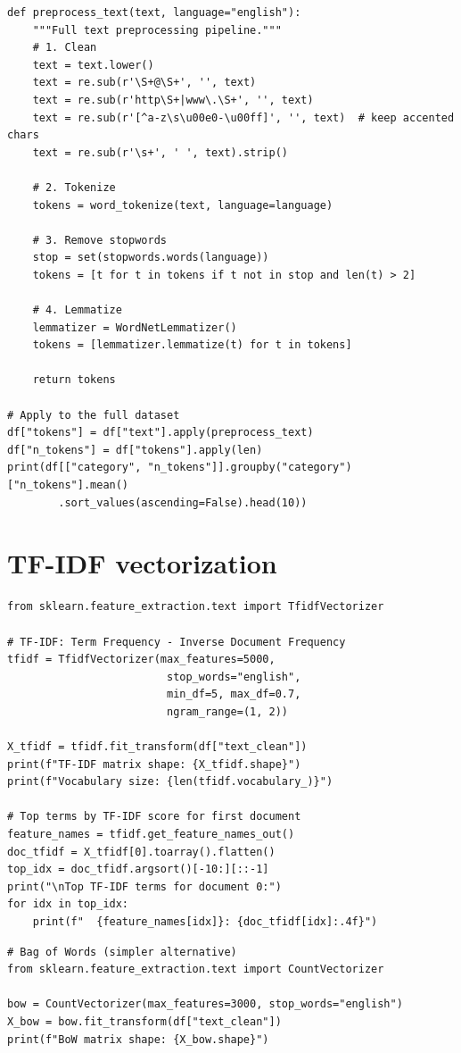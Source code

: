 \begin{verbatim}
def preprocess_text(text, language="english"):
    """Full text preprocessing pipeline."""
    # 1. Clean
    text = text.lower()
    text = re.sub(r'\S+@\S+', '', text)
    text = re.sub(r'http\S+|www\.\S+', '', text)
    text = re.sub(r'[^a-z\s\u00e0-\u00ff]', '', text)  # keep accented chars
    text = re.sub(r'\s+', ' ', text).strip()

    # 2. Tokenize
    tokens = word_tokenize(text, language=language)

    # 3. Remove stopwords
    stop = set(stopwords.words(language))
    tokens = [t for t in tokens if t not in stop and len(t) > 2]

    # 4. Lemmatize
    lemmatizer = WordNetLemmatizer()
    tokens = [lemmatizer.lemmatize(t) for t in tokens]

    return tokens

# Apply to the full dataset
df["tokens"] = df["text"].apply(preprocess_text)
df["n_tokens"] = df["tokens"].apply(len)
print(df[["category", "n_tokens"]].groupby("category")["n_tokens"].mean()
        .sort_values(ascending=False).head(10))
\end{verbatim}

\section{TF-IDF vectorization}

\begin{verbatim}
from sklearn.feature_extraction.text import TfidfVectorizer

# TF-IDF: Term Frequency - Inverse Document Frequency
tfidf = TfidfVectorizer(max_features=5000,
                         stop_words="english",
                         min_df=5, max_df=0.7,
                         ngram_range=(1, 2))

X_tfidf = tfidf.fit_transform(df["text_clean"])
print(f"TF-IDF matrix shape: {X_tfidf.shape}")
print(f"Vocabulary size: {len(tfidf.vocabulary_)}")

# Top terms by TF-IDF score for first document
feature_names = tfidf.get_feature_names_out()
doc_tfidf = X_tfidf[0].toarray().flatten()
top_idx = doc_tfidf.argsort()[-10:][::-1]
print("\nTop TF-IDF terms for document 0:")
for idx in top_idx:
    print(f"  {feature_names[idx]}: {doc_tfidf[idx]:.4f}")
\end{verbatim}

\begin{verbatim}
# Bag of Words (simpler alternative)
from sklearn.feature_extraction.text import CountVectorizer

bow = CountVectorizer(max_features=3000, stop_words="english")
X_bow = bow.fit_transform(df["text_clean"])
print(f"BoW matrix shape: {X_bow.shape}")
\end{verbatim}

